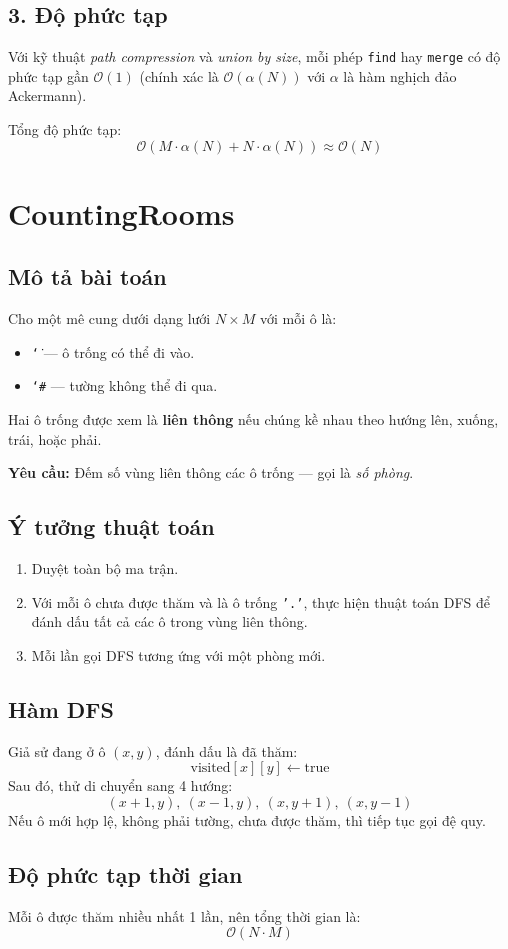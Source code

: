 \documentclass{article}
\begin{document}
	\subsection*{3. Độ phức tạp}
	Với kỹ thuật \textit{path compression} và \textit{union by size}, mỗi phép \texttt{find} hay \texttt{merge} có độ phức tạp gần $\mathcal{O}(1)$ (chính xác là $\mathcal{O}(\alpha(N))$ với $\alpha$ là hàm nghịch đảo Ackermann).
	
	Tổng độ phức tạp:
	\[
	\mathcal{O}(M \cdot \alpha(N) + N \cdot \alpha(N)) \approx \mathcal{O}(N)
	\]
	
	\section{CountingRooms}
	\subsection*{Mô tả bài toán}
	Cho một mê cung dưới dạng lưới $N \times M$ với mỗi ô là:
	\begin{itemize}
		\item \texttt{\char`\.} — ô trống có thể đi vào.
		\item \texttt{\char`\#} — tường không thể đi qua.
	\end{itemize}
	
	Hai ô trống được xem là \textbf{liên thông} nếu chúng kề nhau theo hướng lên, xuống, trái, hoặc phải.
	
	\textbf{Yêu cầu:} Đếm số vùng liên thông các ô trống — gọi là \textit{số phòng}.
	\subsection*{Ý tưởng thuật toán}
	
	\begin{enumerate}
		\item Duyệt toàn bộ ma trận.
		\item Với mỗi ô chưa được thăm và là ô trống \texttt{'.'}, thực hiện thuật toán DFS để đánh dấu tất cả các ô trong vùng liên thông.
		\item Mỗi lần gọi DFS tương ứng với một phòng mới.
	\end{enumerate}
	
	\subsection*{Hàm DFS}
	Giả sử đang ở ô $(x, y)$, đánh dấu là đã thăm:
	\[
	\text{visited}[x][y] \leftarrow \text{true}
	\]
	Sau đó, thử di chuyển sang 4 hướng:
	\[
	(x + 1, y),\ (x - 1, y),\ (x, y + 1),\ (x, y - 1)
	\]
	Nếu ô mới hợp lệ, không phải tường, chưa được thăm, thì tiếp tục gọi đệ quy.
	
	\subsection*{Độ phức tạp thời gian}
	Mỗi ô được thăm nhiều nhất 1 lần, nên tổng thời gian là:
	\[
	\mathcal{O}(N \cdot M)
	\]

	
\end{document}
